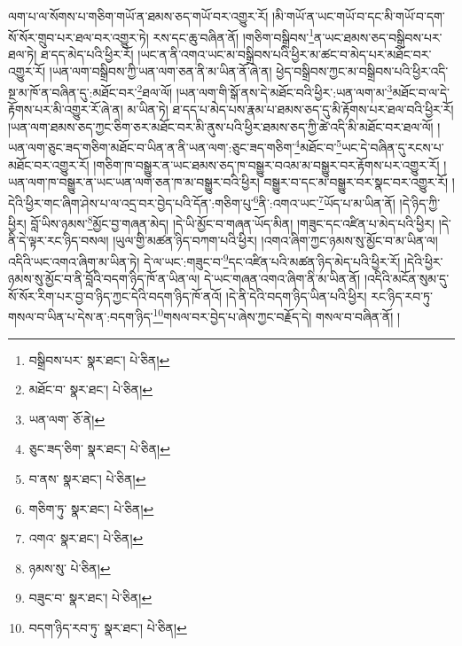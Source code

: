 ལག་པ་ལ་སོགས་པ་གཅིག་གཡོ་ན་ཐམས་ཅད་གཡོ་བར་འགྱུར་རོ། །མི་གཡོ་ན་ཡང་གཡོ་བ་དང་མི་གཡོ་བ་དག་སོ་སོར་གྲུབ་པར་ཐལ་བར་འགྱུར་ཏེ། རས་དང་ཆུ་བཞིན་ནོ། །གཅིག་བསྒྲིབས་\footnote{བསྒྲིབས་པར་  སྣར་ཐང་།  པེ་ཅིན། }ན་ཡང་ཐམས་ཅད་བསྒྲིབས་པར་ཐལ་ཏེ། ཐ་དད་མེད་པའི་ཕྱིར་རོ། །ཡང་ན་ནི་འགའ་ཡང་མ་བསྒྲིབས་པའི་ཕྱིར་མ་ཚང་བ་མེད་པར་མཐོང་བར་འགྱུར་རོ། །ཡན་ལག་བསྒྲིབས་ཀྱི་ཡན་ལག་ཅན་ནི་མ་ཡིན་ནོ་ཞེ་ན། ཕྱེད་བསྒྲིབས་ཀྱང་མ་བསྒྲིབས་པའི་ཕྱིར་འདི་སྔ་མ་ཁོ་ན་བཞིན་དུ་:མཐོང་བར་\footnote{མཐོང་བ་  སྣར་ཐང་།  པེ་ཅིན། }ཐལ་ལོ། །ཡན་ལག་གི་སྒོ་ནས་དེ་མཐོང་བའི་ཕྱིར་:ཡན་ལག་མ་\footnote{ཡན་ལག་  ཅོ་ནེ། }མཐོང་བ་ལ་དེ་རྟོགས་པར་མི་འགྱུར་རོ་ཞེ་ན། མ་ཡིན་ཏེ། ཐ་དད་པ་མེད་པས་རྣམ་པ་ཐམས་ཅད་དུ་མི་རྟོགས་པར་ཐལ་བའི་ཕྱིར་རོ། །ཡན་ལག་ཐམས་ཅད་ཀྱང་ཅིག་ཅར་མཐོང་བར་མི་ནུས་པའི་ཕྱིར་ཐམས་ཅད་ཀྱི་ཚེ་འདི་མི་མཐོང་བར་ཐལ་ལོ། །ཡན་ལག་ཅུང་ཟད་གཅིག་མཐོང་བ་ཡིན་ན་ནི་ཡན་ལག་:ཅུང་ཟད་གཅིག་\footnote{ཅུང་ཟད་ཅིག་  སྣར་ཐང་།  པེ་ཅིན། }མཐོང་བ་\footnote{བ་ནས་  སྣར་ཐང་།  པེ་ཅིན། }ཡང་དེ་བཞིན་དུ་རངས་པ་མཐོང་བར་འགྱུར་རོ། །གཅིག་ཁ་བསྒྱུར་ན་ཡང་ཐམས་ཅད་ཁ་བསྒྱུར་བའམ་མ་བསྒྱུར་བར་རྟོགས་པར་འགྱུར་རོ། །ཡན་ལག་ཁ་བསྒྱུར་ན་ཡང་ཡན་ལག་ཅན་ཁ་མ་བསྒྱུར་བའི་ཕྱིར། བསྒྱུར་བ་དང་མ་བསྒྱུར་བར་སྣང་བར་འགྱུར་རོ། །དེའི་ཕྱིར་གང་ཞིག་ཤེས་པ་ལ་འདྲ་བར་བྱེད་པའི་དོན་:གཅིག་པུ་\footnote{གཅིག་ཏུ་  སྣར་ཐང་།  པེ་ཅིན། }ནི་:འགའ་ཡང་\footnote{འགའ་  སྣར་ཐང་།  པེ་ཅིན། }ཡོད་པ་མ་ཡིན་ནོ། །དེ་ཉིད་ཀྱི་ཕྱིར། བློ་ཡིས་ཉམས་\footnote{ཉམས་སུ་  པེ་ཅིན། }མྱོང་བྱ་གཞན་མེད། །དེ་ཡི་མྱོང་བ་གཞན་ཡོད་མིན། །གཟུང་དང་འཛིན་པ་མེད་པའི་ཕྱིར། །དེ་ནི་དེ་ལྟར་རང་ཉིད་བསལ། །ཡུལ་གྱི་མཚན་ཉིད་བཀག་པའི་ཕྱིར། །འགའ་ཞིག་ཀྱང་ཉམས་སུ་མྱོང་བ་མ་ཡིན་ལ། འདིའི་ཡང་འགའ་ཞིག་མ་ཡིན་ཏེ། དེ་ལ་ཡང་:གཟུང་བ་\footnote{བཟུང་བ་  སྣར་ཐང་།  པེ་ཅིན། }དང་འཛིན་པའི་མཚན་ཉིད་མེད་པའི་ཕྱིར་རོ། །དེའི་ཕྱིར་ཉམས་སུ་མྱོང་བ་ནི་བློའི་བདག་ཉིད་ཁོ་ན་ཡིན་ལ། དེ་ཡང་གཞན་འགའ་ཞིག་ནི་མ་ཡིན་ནོ། །འདིའི་མངོན་སུམ་དུ་སོ་སོར་རིག་པར་བྱ་བ་ཉིད་ཀྱང་དེའི་བདག་ཉིད་ཁོ་ནའོ། །དེ་ནི་དེའི་བདག་ཉིད་ཡིན་པའི་ཕྱིར། རང་ཉིད་རབ་ཏུ་གསལ་བ་ཡིན་པ་དེས་ན་:བདག་ཉིད་\footnote{བདག་ཉིད་རབ་ཏུ་  སྣར་ཐང་།  པེ་ཅིན། }གསལ་བར་བྱེད་པ་ཞེས་ཀྱང་བརྗོད་དེ། གསལ་བ་བཞིན་ནོ། །
